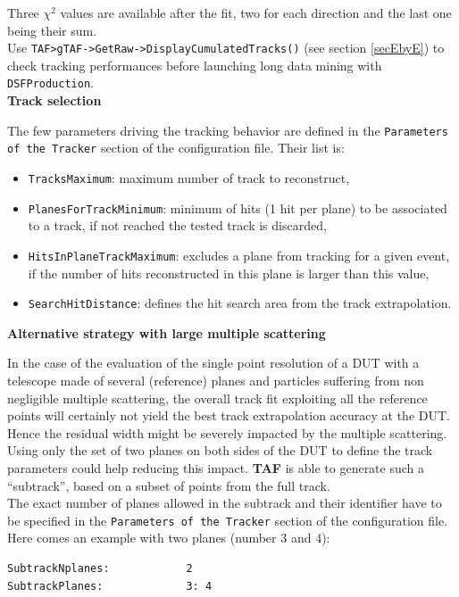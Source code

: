 \documentclass[a4paper, 12pt, twoside]{article}
\newcommand{\TAF}{{\bf TAF }}
\begin{document}
\noindent
Three $\chi^{2}$ values are available after the fit, two for each direction and the last one being their sum.\\

\noindent
Use {\tt TAF>gTAF->GetRaw->DisplayCumulatedTracks()} (see section \ref{secEbyE}) to check tracking performances before launching long data mining with {\tt DSFProduction}.
\\


\noindent
{\bf Track selection}

\noindent
The few parameters driving the tracking behavior are defined in the {\tt Parameters of the Tracker} section of the configuration file. Their list is:
\begin{itemize}
\item  {\tt TracksMaximum}: maximum number of track to reconstruct,
\item {\tt PlanesForTrackMinimum}: minimum of hits (1 hit per plane) to be associated to a track, if not reached the tested track is discarded,  
\item {\tt HitsInPlaneTrackMaximum}:  excludes a plane from tracking for a given event, if the number of hits reconstructed in this plane is larger than this value, 
\item {\tt SearchHitDistance}: defines the hit search area from the track extrapolation. 
\end{itemize}



\noindent
{\bf Alternative strategy with large multiple scattering}

\noindent
In the case of the evaluation of the single point resolution of a DUT with a telescope made of several (reference) planes and particles suffering from non negligible multiple scattering, the overall track fit exploiting all the reference points will certainly not yield the best track extrapolation accuracy at the DUT. Hence the residual width might be severely impacted by the multiple scattering.\\
Using only the set of two planes on both sides of the DUT to define the track parameters could help reducing this impact. \TAF is able to generate such a ``subtrack'', based on a subset of points from the full track.\\
The exact number of planes allowed in the subtrack and their identifier have to be specified in the {\tt Parameters of the Tracker} section of the configuration file. Here comes an example with two planes (number 3 and 4):
\begin{verbatim}
SubtrackNplanes:            2
SubtrackPlanes:             3: 4
\end{verbatim}
\end{document}
